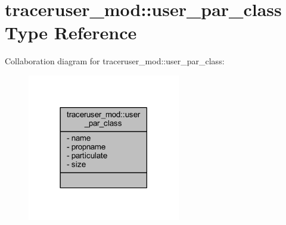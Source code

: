 \hypertarget{structtraceruser__mod_1_1user__par__class}{}\section{traceruser\+\_\+mod\+:\+:user\+\_\+par\+\_\+class Type Reference}
\label{structtraceruser__mod_1_1user__par__class}


Collaboration diagram for traceruser\+\_\+mod\+:\+:user\+\_\+par\+\_\+class\+:\nopagebreak
\begin{figure}[H]
\begin{center}
\leavevmode
\includegraphics[width=189pt]{structtraceruser__mod_1_1user__par__class__coll__graph}
\end{center}
\end{figure}
